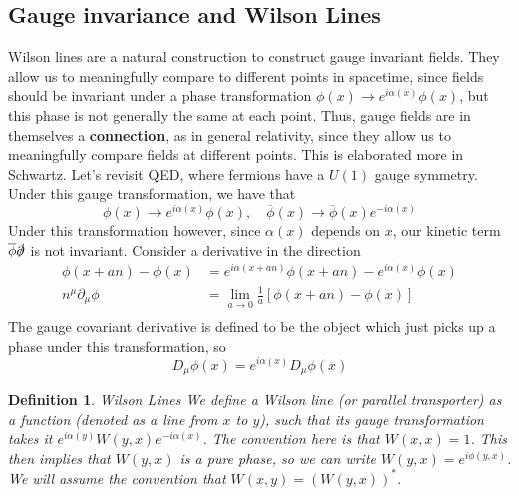 \documentclass[11pt, oneside]{article}   	%
\theoremstyle{slanted}
\newtheorem*{defn}{Definition}
\begin{document}
\subsection{Gauge invariance and Wilson Lines}
Wilson lines are a natural 
construction to construct gauge invariant fields. 
They allow us to meaningfully compare to different points 
in spacetime, since fields should be invariant 
under a phase transformation $ \phi \left(  x  \right) \to e ^{  i \alpha \left(  x  \right)  } \phi \left(  x  \right)  $, 
but this phase is not generally the same at each point. 
Thus, gauge fields are in themselves a \textbf{connection}, 
as in general relativity, since they allow 
us to meaningfully compare fields at different points.
This is elaborated more in Schwartz.
Let's revisit QED, where fermions have 
a $ U \left(  1  \right)  $ gauge symmetry. 
Under this gauge transformation, we 
have that 
\[
	\phi \left(  x  \right)  \to e ^{ i \alpha \left(  x  \right)  } \phi \left(  x  \right) , 
	\quad \overline{ \phi } \left(  x  \right)  \to \overline{ \phi } \left(  x  \right)  
	e ^{  - i \alpha \left(  x  \right)  } 
\] Under this transformation however, 
since $ \alpha \left(  x  \right)  $ depends on $ x $, 
our kinetic term $ \overline{ \phi } \slashed{\partial } $
is not invariant. Consider a derivative 
in the direction 
\begin{align*}
	\phi \left( x + an  \right)  - \phi \left(  x \right)  &=  e ^{ i \alpha \left(  x + an  \right)  } \phi \left( 
	x + an \right)   - e ^{ i \alpha \left(  x  \right)  } \phi \left(  x  \right)   \\ 
	n ^ \mu \partial  _ \mu \phi  &=  \lim_{ a \to 0 } \frac{1}{a } 
	\left[  \phi \left(  x+ an  \right)   - \phi \left(  x \right)  \right] \\
\end{align*}
The gauge covariant derivative 
is defined to be the object which 
just picks up a phase under this transformation, 
so 
\[
	D _ \mu \phi \left(  x  \right)   = e ^{  i \alpha \left( x  \right) } D _ \mu \phi \left(  x  \right) 
\] 
\begin{defn}{Wilson Lines}
	We define a Wilson line (or parallel transporter)
	as a function (denoted as a line from $ x $ to $ y $), 
	such that its gauge transformation takes it
	$ e ^{ i  \alpha \left( y  \right)  } W \left( y , x  \right)  e ^{  - i \alpha \left(  x  \right)  } $. 
	The convention here is that $ W\left( x, x  \right)   = 1$. 
	This then implies that $ W \left( y , x  \right)  $ is a pure phase, 
	so we can write $ W \left( y , x  \right)   = e ^{i \phi \left( y , x  \right)   }  $. 
	We will assume the convention that $ W \left( x, y  \right)   = \left(   W \left( y , x  \right)   \right)  
	^ * $. 
\end{defn}
\end{document}

